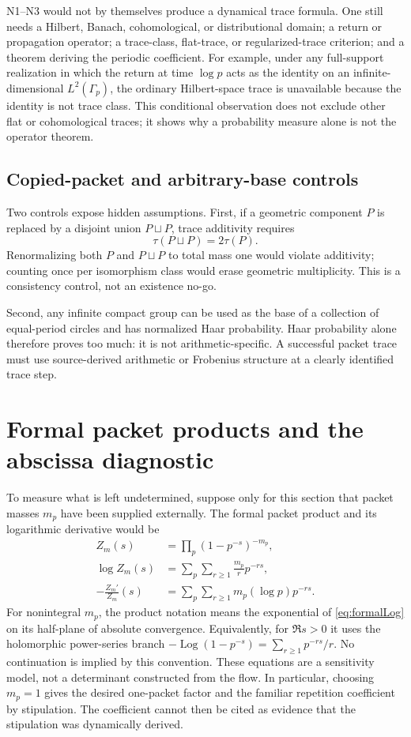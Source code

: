 \documentclass[11pt]{article}
\theoremstyle{definition}
\theoremstyle{remark}
\begin{document}
N1--N3 would not by themselves produce a dynamical trace formula.  One still
needs a Hilbert, Banach, cohomological, or distributional domain; a return or
propagation operator; a trace-class, flat-trace, or regularized-trace
criterion; and a theorem deriving the periodic coefficient.  For example,
under any full-support realization in which the return at time \(\log p\)
acts as the identity on an infinite-dimensional \(L^2(\Gamma_p)\), the
ordinary Hilbert-space trace is unavailable because the identity is not trace
class.  This conditional observation does not exclude other flat or
cohomological traces; it shows why a probability measure alone is not the
operator theorem.

\subsection{Copied-packet and arbitrary-base controls}

Two controls expose hidden assumptions.  First, if a geometric component
\(P\) is replaced by a disjoint union \(P\sqcup P\), trace additivity requires
\[
 \tau(P\sqcup P)=2\tau(P).
\]
Renormalizing both \(P\) and \(P\sqcup P\) to total mass one would violate
additivity; counting once per isomorphism class would erase geometric
multiplicity.  This is a consistency control, not an existence no-go.

Second, any infinite compact group can be used as the base of a collection of
equal-period circles and has normalized Haar probability.  Haar probability
alone therefore proves too much: it is not arithmetic-specific.  A successful
packet trace must use source-derived arithmetic or Frobenius structure at a
clearly identified trace step.

\section{Formal packet products and the abscissa diagnostic}
\label{sec:formalproduct}

To measure what is left undetermined, suppose only for this section that
packet masses \(m_p\) have been supplied externally.  The formal packet
product and its logarithmic derivative would be
\begin{align}
 Z_m(s)
   &=\prod_p(1-p^{-s})^{-m_p}, \label{eq:formalZm}\\
 \log Z_m(s)
   &=\sum_p\sum_{r\ge1}\frac{m_p}{r}p^{-rs}, \label{eq:formalLog}\\
 -\frac{Z_m'}{Z_m}(s)
   &=\sum_p\sum_{r\ge1}m_p(\log p)p^{-rs}.
 \label{eq:formalDerivative}
\end{align}
For nonintegral \(m_p\), the product notation means the exponential of
\eqref{eq:formalLog} on its half-plane of absolute convergence.  Equivalently,
for \(\Re s>0\) it uses the holomorphic power-series branch
\(-\operatorname{Log}(1-p^{-s})=\sum_{r\ge1}p^{-rs}/r\).  No continuation is implied by
this convention.
These equations are a sensitivity model, not a determinant constructed from
the flow.  In particular, choosing \(m_p=1\) gives the desired one-packet
factor and the familiar repetition coefficient by stipulation.  The
coefficient cannot then be cited as evidence that the stipulation was
dynamically derived.
\end{document}
